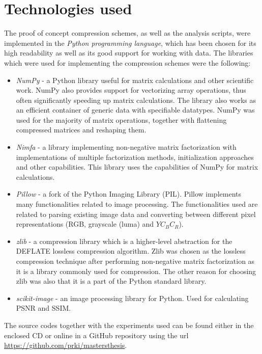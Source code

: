 \documentclass[thesis=M,english]{FITthesis}[2012/10/20]
\begin{document}
\section{Technologies used}
The proof of concept compression schemes, as well as the analysis scripts, were implemented
in the \emph{Python programming language}, which has been chosen for its high readability
as well as its good support for working with data. The libraries which were used for
implementing the compression schemes were the following:
\begin{itemize}
  \item \emph{NumPy} - a Python library useful for matrix calculations and other scientific work.
        NumPy also provides support for vectorizing array operations, thus often significantly
        speeding up matrix calculations. The library also works as an efficient container of
        generic data with specifiable datatypes. NumPy was used for the majority of matrix
        operations, together with flattening compressed matrices and reshaping them.\cite{numpy}
  \item \emph{Nimfa} - a library implementing non-negative matrix factorization
        with implementations of multiple factorization methods, initialization
        approaches and other capabilities. This library uses the capabilities of NumPy
        for matrix calculations.\cite{nimfa}
  \item \emph{Pillow} - a fork of the Python Imaging Library (PIL).
        Pillow implements many functionalities related to image processing. The
        functionalities used are related to parsing existing image data and converting
        between different pixel representations (RGB, grayscale (luma) and $YC_BC_R$).\cite{pillow}
  \item \emph{zlib} - a compression library which is a higher-level abstraction for the DEFLATE
        lossless compression algorithm. Zlib was chosen as the lossless compression
        technique after performing non-negative matrix factorization as it is a library commonly
        used for compression. The other reason for choosing zlib was also that it is
	   a part of the Python standard library.
  \item \emph{scikit-image} - an image processing library for Python. Used for
        calculating PSNR and SSIM.\cite{scikit-image}
\end{itemize}

The source codes together with the experiments used can be found either in the enclosed
CD or online in a GitHub repository using the url \url{https://github.com/prki/mastersthesis}.
\end{document}
